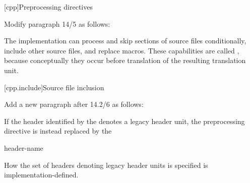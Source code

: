 \setcounter{chapter}{13}
[cpp]{Preprocessing directives}%

\begin{after}
Modify paragraph 14/5 as follows:

\begin{std.txt}
\resetalinea[4]
\alinea
The implementation can
process and skip sections of source files conditionally,
include other source files,
and replace macros.
These capabilities are called
,
because conceptually they occur
before translation of the resulting translation unit.
\end{std.txt}
\end{after}

\setcounter{section}{1}
[cpp.include]{Source file inclusion}%

\begin{after}
Add a new paragraph after 14.2/6 as follows:

\begin{std.txt}
\resetalinea[6]
\color{addclr}
\alinea
If the header identified by the 
denotes a legacy header unit, the preprocessing directive
is instead replaced by the 

\begin{bnf}
 header-name \terminal{;}
\end{bnf}

\color{addclr}
How the set of headers denoting legacy header units is specified
is implementation-defined.
\end{std.txt}
\end{after}

